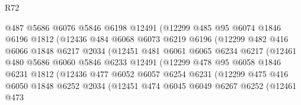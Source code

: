 \begin{lexlean}{R72}
\begin{coremodule}
                        @487
                        @5686
                        @6076
                        @5846
                        @6198
                        @12491
                        (@12299
                          @485
                          @95
                          @6074
                          @1846
                          @6196
                          @1812
                          (@12436
                            @484
                            @6068
                            @6073
                            @6219
                            @6196
                            (@12299
                              @482
                              @416
                              @6066
                              @1848
                              @6217
                              @2034
                              (@12451
                                @481
                                @6061
                                @6065
                                @6234
                                @6217
                                (@12461
                                  @480
                                  @5686
                                  @6060
                                  @5846
                                  @6233
                                  @12491
                                  (@12299
                                    @478
                                    @95
                                    @6058
                                    @1846
                                    @6231
                                    @1812
                                    (@12436
                                      @477
                                      @6052
                                      @6057
                                      @6254
                                      @6231
                                      (@12299
                                        @475
                                        @416
                                        @6050
                                        @1848
                                        @6252
                                        @2034
                                        (@12451
                                          @474
                                          @6045
                                          @6049
                                          @6267
                                          @6252
                                          (@12461
                                            @473

\end{coremodule}
\end{lexlean}
